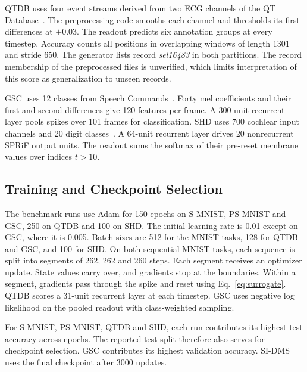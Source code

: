 \documentclass[letterpaper,journal]{IEEEtran}
\begin{document}
QTDB uses four event streams derived from two ECG channels of the QT Database~\cite{laguna1997database}. The preprocessing code smooths each channel and thresholds its first differences at $\pm0.03$. The readout predicts six annotation groups at every timestep. Accuracy counts all positions in overlapping windows of length 1301 and stride 650. The generator lists record \emph{sel16483} in both partitions. The record membership of the preprocessed files is unverified, which limits interpretation of this score as generalization to unseen records.

GSC uses 12 classes from Speech Commands~\cite{warden2018speech}. Forty mel coefficients and their first and second differences give 120 features per frame. A 300-unit recurrent layer pools spikes over 101 frames for classification. SHD uses 700 cochlear input channels and 20 digit classes~\cite{cramer2022heidelberg}. A 64-unit recurrent layer drives 20 nonrecurrent SPRiF output units. The readout sums the softmax of their pre-reset membrane values over indices $t>10$.

\subsection{Training and Checkpoint Selection}
\label{sec:training}

The benchmark runs use Adam for 150 epochs on S-MNIST, PS-MNIST and GSC, 250 on QTDB and 100 on SHD. The initial learning rate is 0.01 except on GSC, where it is 0.005. Batch sizes are 512 for the MNIST tasks, 128 for QTDB and GSC, and 100 for SHD. On both sequential MNIST tasks, each sequence is split into segments of 262, 262 and 260 steps. Each segment receives an optimizer update. State values carry over, and gradients stop at the boundaries. Within a segment, gradients pass through the spike and reset using Eq.~\eqref{eq:surrogate}. QTDB scores a 31-unit recurrent layer at each timestep. GSC uses negative log likelihood on the pooled readout with class-weighted sampling.

For S-MNIST, PS-MNIST, QTDB and SHD, each run contributes its highest test accuracy across epochs. The reported test split therefore also serves for checkpoint selection. GSC contributes its highest validation accuracy. SI-DMS uses the final checkpoint after 3000 updates.
\end{document}
